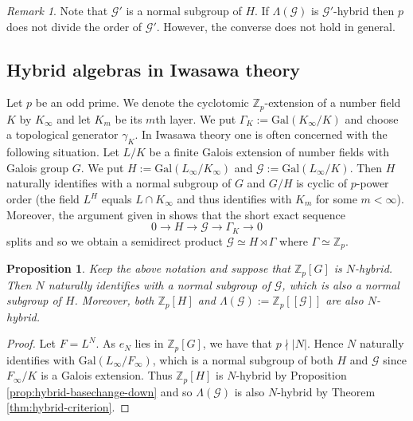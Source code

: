 \documentclass[12pt]{amsart}
\theoremstyle{plain}
\newtheorem{prop}[theorem]{Proposition}
\theoremstyle{remark}
\newtheorem{remark}[theorem]{Remark}
\theoremstyle{definition}
\numberwithin{equation}{section}
\begin{document}
\begin{remark}
Note that $\mathcal{G}'$ is a normal subgroup of $H$.
If $\Lambda(\mathcal{G})$ is $\mathcal{G}'$-hybrid then $p$ does not divide the order of $\mathcal{G}'$.
However, the converse does not hold in general.
\end{remark}

\subsection{Hybrid algebras in Iwasawa theory}\label{subsec:algebras-in-Iwasawa-thy}
Let $p$ be an odd prime.
We denote the cyclotomic ${\mathbb{Z}}_{p}$-extension of a number field $K$ by $K_{\infty}$ and let $K_{m}$ be its $m$th layer.
We put $\Gamma_{K} := {\mathrm{Gal}}(K_{\infty}/K)$
and choose a topological generator $\gamma_{K}$. In Iwasawa theory one is often concerned with the
following situation. Let $L/K$ be a finite Galois extension of number fields with Galois group $G$.
We put $H := {\mathrm{Gal}}(L_{\infty}/K_{\infty})$ and $\mathcal{G} := {\mathrm{Gal}}(L_{\infty}/K)$.
Then $H$ naturally identifies with a normal subgroup of $G$ and $G/H$ is cyclic of $p$-power order
(the field $L^{H}$ equals $L \cap K_{\infty}$ and thus identifies with $K_{m}$ for some $m< \infty$).
Moreover,  the argument given in \cite[\S 1]{MR2114937} shows that the short exact sequence
\[
0 \longrightarrow H \longrightarrow \mathcal{G} \longrightarrow \Gamma_{K} \longrightarrow 0
\]
splits and so we obtain a semidirect product $\mathcal{G} \simeq H \rtimes \Gamma$ where $\Gamma \simeq {\mathbb{Z}}_{p}$.

\begin{prop}\label{prop:hybrid-codescent}
Keep the above notation and suppose that ${\mathbb{Z}}_{p}[G]$ is $N$-hybrid.
Then $N$ naturally identifies with a normal subgroup of $\mathcal{G}$,
which is also a normal subgroup of $H$.
Moreover, both ${\mathbb{Z}}_{p}[H]$ and $\Lambda(\mathcal{G}):={\mathbb{Z}}_{p}[[\mathcal{G}]]$ are also $N$-hybrid.
\end{prop}

\begin{proof}
Let $F = L^{N}$.
As $e_{N}$ lies in ${\mathbb{Z}}_{p}[G]$, we have that $p \nmid |N|$.
Hence $N$ naturally identifies with ${\mathrm{Gal}}(L_{\infty}/F_{\infty})$, which is a normal subgroup of both 
$H$ and $\mathcal{G}$
since $F_{\infty}/K$ is a Galois extension.
Thus ${\mathbb{Z}}_{p}[H]$ is $N$-hybrid by Proposition \ref{prop:hybrid-basechange-down} and so
$\Lambda(\mathcal{G})$ is also $N$-hybrid by Theorem \ref{thm:hybrid-criterion}.
\end{proof}
\end{document}
